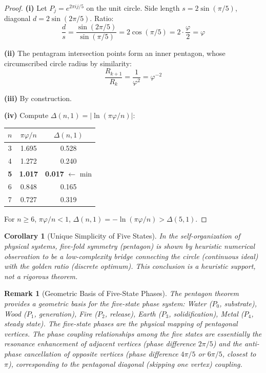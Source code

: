 \documentclass[12pt,a4paper,twocolumn]{article}
\renewcommand{\phi}{\varphi}
\newtheorem{corollary}[theorem]{Corollary}
\newtheorem{remark}[theorem]{Remark}
\begin{document}
\begin{proof}
\textbf{(i)} Let $P_j = e^{2\pi i j/5}$ on the unit circle. Side length $s = 2\sin(\pi/5)$, diagonal $d = 2\sin(2\pi/5)$. Ratio:
\begin{equation}
\frac{d}{s} = \frac{\sin(2\pi/5)}{\sin(\pi/5)} = 2\cos(\pi/5) = 2 \cdot \frac{\phi}{2} = \phi
\end{equation}

\textbf{(ii)} The pentagram intersection points form an inner pentagon, whose circumscribed circle radius by similarity:
\begin{equation}
\frac{R_{k+1}}{R_k} = \frac{1}{\phi^2} = \phi^{-2}
\end{equation}

\textbf{(iii)} By construction.

\textbf{(iv)} Compute $\Delta(n,1) = |\ln(\pi\phi/n)|$:
\begin{center}
\begin{tabular}{c|c|c}
$n$ & $\pi\phi/n$ & $\Delta(n,1)$ \\
\hline
3 & 1.695 & 0.528 \\
4 & 1.272 & 0.240 \\
\textbf{5} & \textbf{1.017} & \textbf{0.017} $\leftarrow$ min \\
6 & 0.848 & 0.165 \\
7 & 0.727 & 0.319 \\
\end{tabular}
\end{center}
For $n \geq 6$, $\pi\phi/n < 1$, $\Delta(n,1) = -\ln(\pi\phi/n) > \Delta(5,1)$.
\end{proof}

\begin{corollary}[Unique Simplicity of Five States]
In the self-organization of physical systems, five-fold symmetry (pentagon) is shown by heuristic numerical observation to be a low-complexity bridge connecting the circle (continuous ideal) with the golden ratio (discrete optimum). This conclusion is a heuristic support, not a rigorous theorem.
\end{corollary}

\begin{remark}[Geometric Basis of Five-State Phases]
The pentagon theorem provides a geometric basis for the five-state phase system: Water ($P_0$, substrate), Wood ($P_1$, generation), Fire ($P_2$, release), Earth ($P_3$, solidification), Metal ($P_4$, steady state). The five-state phases are the physical mapping of pentagonal vertices. The phase coupling relationships among the five states are essentially the resonance enhancement of adjacent vertices (phase difference $2\pi/5$) and the anti-phase cancellation of opposite vertices (phase difference $4\pi/5$ or $6\pi/5$, closest to $\pi$), corresponding to the pentagonal diagonal (skipping one vertex) coupling.
\end{remark}
\end{document}
